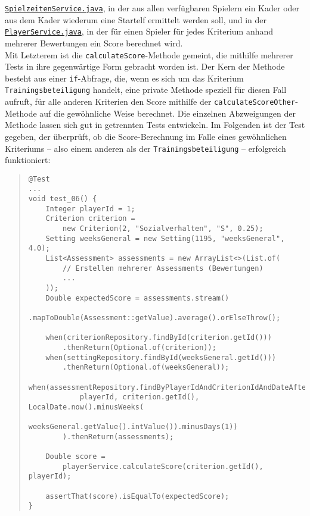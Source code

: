 \href{https://github.com/FlorianOhmes/bat_spielzeitenplaner/blob/main/spielzeitenplaner/src/main/java/de/bathesis/spielzeitenplaner/services/SpielzeitenService.java}{\texttt{SpielzeitenService.java}}, 
in der aus allen verfügbaren Spielern ein Kader oder aus dem Kader wiederum eine 
Startelf ermittelt werden soll, und in der 
\href{https://github.com/FlorianOhmes/bat_spielzeitenplaner/blob/main/spielzeitenplaner/src/main/java/de/bathesis/spielzeitenplaner/services/PlayerService.java}{\texttt{PlayerService.java}}, in der für einen Spieler 
für jedes Kriterium anhand mehrerer Bewertungen ein Score berechnet wird. \\ 
Mit Letzterem ist die \texttt{calculateScore}-Methode gemeint, die mithilfe mehrerer 
Tests in ihre gegenwärtige Form gebracht worden ist. Der Kern der Methode besteht 
aus einer \texttt{if}-Abfrage, die, wenn es sich um das Kriterium 
\texttt{Trainingsbeteiligung} handelt, eine private Methode speziell für diesen 
Fall aufruft, für alle anderen Kriterien den Score mithilfe der 
\texttt{calculateScoreOther}-Methode auf die gewöhnliche Weise berechnet. Die 
einzelnen Abzweigungen der Methode lassen sich gut in getrennten Tests entwickeln. 
Im Folgenden ist der Test gegeben, der überprüft, ob die Score-Berechnung im Falle 
eines gewöhnlichen Kriteriums -- also einem anderen als der 
\texttt{Trainingsbeteiligung} -- erfolgreich funktioniert: 


\pagebreak


\begin{quote}
\begin{verbatim}
@Test
...
void test_06() {
    Integer playerId = 1;
    Criterion criterion = 
        new Criterion(2, "Sozialverhalten", "S", 0.25);
    Setting weeksGeneral = new Setting(1195, "weeksGeneral", 4.0);
    List<Assessment> assessments = new ArrayList<>(List.of(
        // Erstellen mehrerer Assessments (Bewertungen) 
        ... 
    ));
    Double expectedScore = assessments.stream()
        .mapToDouble(Assessment::getValue).average().orElseThrow();

    when(criterionRepository.findById(criterion.getId()))
        .thenReturn(Optional.of(criterion));
    when(settingRepository.findById(weeksGeneral.getId()))
        .thenReturn(Optional.of(weeksGeneral));
    when(assessmentRepository.findByPlayerIdAndCriterionIdAndDateAfter(
            playerId, criterion.getId(), LocalDate.now().minusWeeks(
                weeksGeneral.getValue().intValue()).minusDays(1))
        ).thenReturn(assessments);

    Double score = 
        playerService.calculateScore(criterion.getId(), playerId);

    assertThat(score).isEqualTo(expectedScore);
}
\end{verbatim}
\end{quote}

